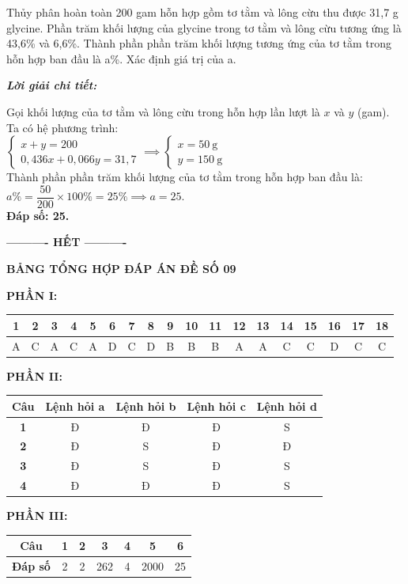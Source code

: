 \documentclass[11pt,a4paper]{article}
\def\loigiai#1{
\par\begingroup\color{blue!80!black}\small
\noindent\textbf{\textit{Lời giải chi tiết:}}\par
#1\par\endgroup}
\begin{document}
\begin{ex}
Thủy phân hoàn toàn 200 gam hỗn hợp gồm tơ tằm và lông cừu thu được 31,7 g glycine. Phần trăm khối lượng của glycine trong tơ tằm và lông cừu tương ứng là 43,6\% và 6,6\%. Thành phần phần trăm khối lượng tương ứng của tơ tằm trong hỗn hợp ban đầu là a\%. Xác định giá trị của a.
\loigiai{
Gọi khối lượng của tơ tằm và lông cừu trong hỗn hợp lần lượt là $x$ và $y$ (gam).\\
Ta có hệ phương trình:\\
$\begin{cases} x + y = 200 \\ 0{,}436x + 0{,}066y = 31{,}7 \end{cases} \implies \begin{cases} x = 50\ \text{g} \\ y = 150\ \text{g} \end{cases}$\\
Thành phần phần trăm khối lượng của tơ tằm trong hỗn hợp ban đầu là:\\
$a\% = \dfrac{50}{200} \times 100\% = 25\% \implies a = 25$.\\
\textbf{Đáp số: 25.}}
\end{ex}


\vspace{0.1cm}
\begin{center}
	\textbf{---------- HẾT ----------}
\end{center}

\vspace{0.3cm}
\noindent
\textbf{\large\color{mainGreen}BẢNG TỔNG HỢP ĐÁP ÁN ĐỀ SỐ 09}

\vspace{0.2cm}
\noindent\textbf{PHẦN I:}\\
\begin{tabular}{|c|c|c|c|c|c|c|c|c|c|c|c|c|c|c|c|c|c|}
\hline
\textbf{1} & \textbf{2} & \textbf{3} & \textbf{4} & \textbf{5} & \textbf{6} & \textbf{7} & \textbf{8} & \textbf{9} & \textbf{10} & \textbf{11} & \textbf{12} & \textbf{13} & \textbf{14} & \textbf{15} & \textbf{16} & \textbf{17} & \textbf{18} \\
\hline
A & C & A & C & A & D & C & D & B & B & B & A & A & C & C & D & C & C \\
\hline
\end{tabular}

\vspace{0.3cm}
\noindent\textbf{PHẦN II:}\\
\begin{tabular}{|c|c|c|c|c|}
\hline
\textbf{Câu} & \textbf{Lệnh hỏi a} & \textbf{Lệnh hỏi b} & \textbf{Lệnh hỏi c} & \textbf{Lệnh hỏi d} \\
\hline
\textbf{1} & Đ & Đ & Đ & S \\
\hline
\textbf{2} & Đ & S & Đ & Đ \\
\hline
\textbf{3} & Đ & S & Đ & S \\
\hline
\textbf{4} & Đ & Đ & Đ & S \\
\hline
\end{tabular}

\vspace{0.3cm}
\noindent\textbf{PHẦN III:}\\
\begin{tabular}{|c|c|c|c|c|c|c|}
\hline
\textbf{Câu} & \textbf{1} & \textbf{2} & \textbf{3} & \textbf{4} & \textbf{5} & \textbf{6} \\
\hline
\textbf{Đáp số} & 2 & 2 & 262 & 4 & 2000 & 25 \\
\hline
\end{tabular}
\end{document}
